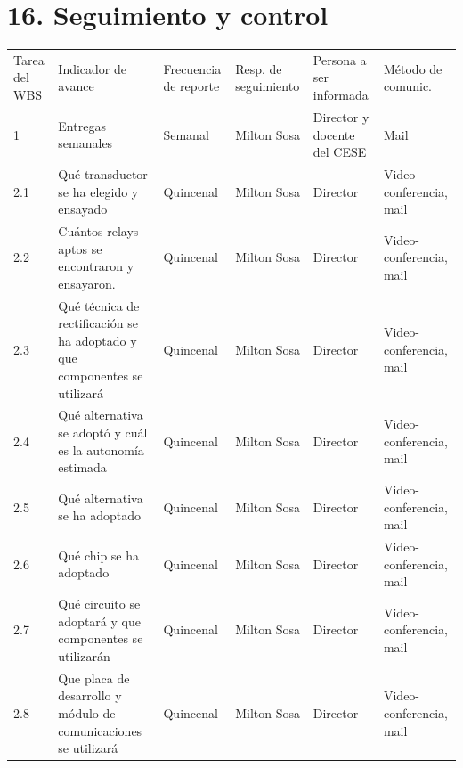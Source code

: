 \documentclass[11pt]{charter}
\begin{document}
\section{16. Seguimiento y control}
\label{sec:seguimiento}
\begin{table}[H]
\centering
\begin{tabularx}{\linewidth}{@{}|X|X|X|X|X|X|@{}}
\hline
\rowcolor[HTML]{C0C0C0} 
\multicolumn{6}{|c|}{\cellcolor[HTML]{C0C0C0}SEGUIMIENTO DE AVANCE}                                                                       \\ \hline
\rowcolor[HTML]{C0C0C0} 
Tarea del WBS & Indicador de avance & Frecuencia de reporte & Resp. de seguimiento & Persona a ser informada & Método de comunic. \\ \hline
 1&Entregas semanales& Semanal&Milton Sosa& Director y docente del CESE&Mail\\ \hline
 2.1&Qué transductor se ha elegido y ensayado&Quincenal&Milton Sosa&Director&Video-conferencia, mail\\ \hline
 2.2&Cuántos relays aptos se encontraron y ensayaron.&Quincenal&Milton Sosa&Director&Video-conferencia, mail\\ \hline
 2.3&Qué técnica de rectificación se ha adoptado y que componentes se utilizará&Quincenal&Milton Sosa&Director& Video-conferencia, mail\\ \hline
 2.4&Qué alternativa se adoptó y cuál es la autonomía estimada&Quincenal&Milton Sosa&Director&Video-conferencia, mail\\ \hline
 2.5&Qué alternativa se ha adoptado&Quincenal&Milton Sosa&Director&Video-conferencia, mail\\ \hline
 2.6&Qué chip se ha adoptado&Quincenal&Milton Sosa&Director&Video-conferencia, mail\\ \hline
 2.7&Qué circuito se adoptará y que componentes se utilizarán&Quincenal&Milton Sosa&Director&Video-conferencia, mail\\ \hline
 2.8&Que placa de desarrollo y módulo de comunicaciones se utilizará&Quincenal&Milton Sosa&Director&Video-conferencia, mail\\ \hline
\end{tabularx}%
\end{table}
\end{document}
